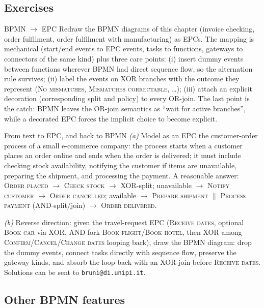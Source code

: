 \subsection{Exercises}

\begin{examplebox}{BPMN $\to$ EPC}
Redraw the BPMN diagrams of this chapter (invoice checking, order fulfilment, order fulfilment with manufacturing) as EPCs. The mapping is mechanical (start/end events to EPC events, tasks to functions, gateways to connectors of the same kind) plus three care points: (i) insert dummy events between functions wherever BPMN had direct sequence flow, so the alternation rule survives; (ii) label the events on XOR branches with the outcome they represent (\textsc{No mismatches}, \textsc{Mismatches correctable}, \dots); (iii) attach an explicit decoration (corresponding split and policy) to every OR-join. The last point is the catch: BPMN leaves the OR-join semantics as ``wait for active branches'', while a decorated EPC forces the implicit choice to become explicit.
\end{examplebox}

\begin{examplebox}{From text to EPC, and back to BPMN}
\emph{(a)} Model as an EPC the customer-order process of a small e-commerce company: the process starts when a customer places an order online and ends when the order is delivered; it must include checking stock availability, notifying the customer if items are unavailable, preparing the shipment, and processing the payment. A reasonable answer: \textsc{Order placed} $\to$ \textsc{Check stock} $\to$ XOR-split; unavailable $\to$ \textsc{Notify customer} $\to$ \textsc{Order cancelled}; available $\to$ \textsc{Prepare shipment} $\|$ \textsc{Process payment} (AND-split/join) $\to$ \textsc{Order delivered}.
\par\smallskip
\emph{(b)} Reverse direction: given the travel-request EPC (\textsc{Receive dates}, optional \textsc{Book car} via XOR, AND fork \textsc{Book flight}/\textsc{Book hotel}, then XOR among \textsc{Confirm}/\textsc{Cancel}/\textsc{Change dates} looping back), draw the BPMN diagram: drop the dummy events, connect tasks directly with sequence flow, preserve the gateway kinds, and absorb the loop-back with an XOR-join before \textsc{Receive dates}. Solutions can be sent to \texttt{bruni@di.unipi.it}.
\end{examplebox}

\subsection{Other BPMN features}

